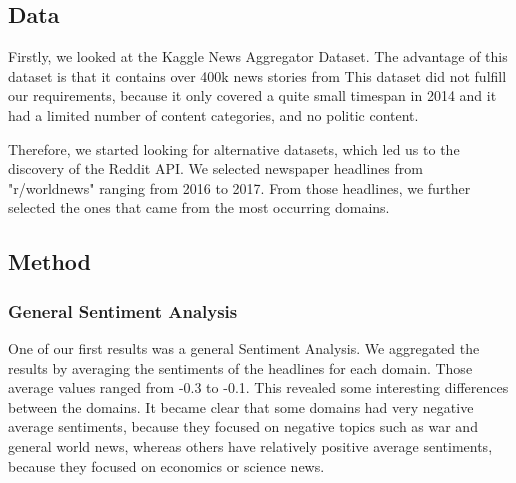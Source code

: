 \documentclass[final]{ieee}
\begin{document}
\subsection{Data}

Firstly, we looked at the Kaggle News Aggregator Dataset\cite{Lichman13}. The advantage of this dataset is that it contains over 400k news stories from 
This dataset did not fulfill our requirements, because it only covered a quite small timespan in 2014 and it had a limited number of content categories, and no politic content.

Therefore, we started looking for alternative datasets, which led us to the discovery of the Reddit API. We selected newspaper headlines from "r/worldnews" ranging from 2016 to 2017. From those headlines, we further selected the ones that came from the most occurring domains. %

\subsection{Method}\label{sec:method}


\subsubsection{General Sentiment Analysis}

One of our first results was a general Sentiment Analysis. %
We aggregated the results by averaging the sentiments of the headlines for each domain. Those average values ranged from -0.3 to -0.1. %
This revealed some interesting differences between the domains. It became clear that some domains had very negative average sentiments, because they focused on negative topics such as war and general world news, whereas others have relatively positive average sentiments, because they focused on economics or science news. %
\end{document}
